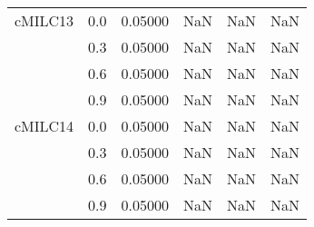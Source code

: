 \begin{longtable}{cccccc}
cMILC13 & 0.0 & 0.05000 & NaN & NaN & NaN \\
        & 0.3 & 0.05000 & NaN & NaN & NaN \\
        & 0.6 & 0.05000 & NaN & NaN & NaN \\
        & 0.9 & 0.05000 & NaN & NaN & NaN \\
cMILC14 & 0.0 & 0.05000 & NaN & NaN & NaN \\
        & 0.3 & 0.05000 & NaN & NaN & NaN \\
        & 0.6 & 0.05000 & NaN & NaN & NaN \\
        & 0.9 & 0.05000 & NaN & NaN & NaN \\
\end{longtable}
